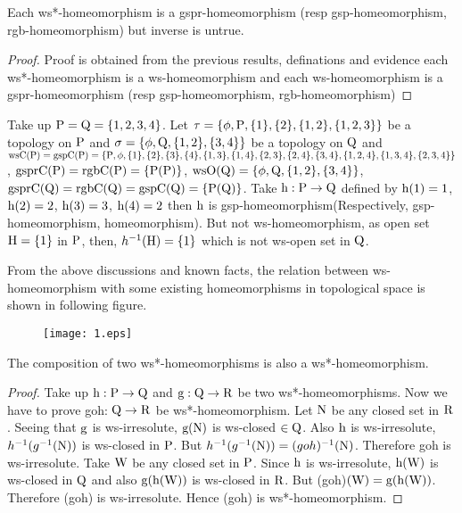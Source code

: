\begin{thm}\label{thm5.2.7}
Each ws*-homeomorphism is a gspr-homeomorphism (resp gsp-homeomorphism, rgb-homeomorphism) but inverse is untrue.
\end{thm}

\begin{proof}
Proof is obtained from the previous results, definations and evidence each ws*-homeomorphism is a ws-homeomorphism and each ws-homeomorphism is a gspr-homeomorphism (resp gsp-homeomorphism, rgb-homeomorphism)
\end{proof}

\begin{exm}\label{exam5.2.10}
Take up $\mathrm{P}=\mathrm{Q}= \{1, 2, 3, 4\}$. Let $\tau= \{\phi, \TSP, \{1\}, \{2\}, \{1, 2\},\break \{1,2,3\}\}$ be a topology on $\mathrm{P}$ and $\sigma=\{\phi,\mathrm{Q},\{1,2\},\{3,4\}\}$ be a topology on $\mathrm{Q}$ and $\ws\TSC(\TSP)= \gsp\TSC(\TSP)=\{\TSP, \phi,\{1\},\{2\},\{3\},\{4\},\{1,3\},\{1,4\},\{2,3\},\{2,4\},\{3,4\},\break \{1,2,4\},\{1,3,4\},\{2,3,4\}\}$, $\mathrm{gspr}\mathrm{C}(\mathrm{P})=\mathrm{rgb}\mathrm{C}(\mathrm{P})=\{\mathrm{P}(\mathrm{P})\}$, $\ws\TSO(\TSQ)=\{\phi,\TSQ,\{1,2\},\break \{3,4\}\}$, $\mathrm{gspr}\mathrm{C}(\mathrm{Q})=\mathrm{rgb}\mathrm{C}(\mathrm{Q})=\mathrm{gsp}\mathrm{C}(\mathrm{Q})=\{\mathrm{P}(\mathrm{Q})\}$. Take $\mathrm{h}: \mathrm{P}\to \mathrm{Q}$ defined by $\mathrm{h}(1)=1$, $\mathrm{h}(2)= 2$, $\mathrm{h}(3)=3$, $\mathrm{h}(4)=2$ then $\mathrm{h}$ is gsp-homeomorphism(Respectively, gsp-homeomorphism, homeomorphism). But not ws-homeomorphism, as open set $\mathrm{H}= \{1\}$ in $\mathrm{P}$, then, $h^{-1} (\mathrm{H}) = \{1\}$ which is not ws-open set in $\mathrm{Q}$.
\end{exm}

\begin{rem}\label{rem5.2.3} 
From the above discussions and known facts, the relation between ws-homeomorphism with some existing homeomorphisms in topological space is shown in
following figure.
\begin{figure}[!ht]
\centering
\texttt{[image: 1.eps]}
\end{figure}
\end{rem}

\begin{thm}\label{thm5.2.8} 
The composition of two ws*-homeomorphisms is also a ws*-{\break}homeomor\-phism.
\end{thm}

\begin{proof}
Take up $\mathrm{h}: \mathrm{P}\to \mathrm{Q}$ and $\mathrm{g}: \mathrm{Q}\to \mathrm{R}$ be two ws*-homeomorphisms. Now we have to prove goh: $\mathrm{Q}\to \mathrm{R}$ be ws*-homeomorphism. Let $\mathrm{N}$ be any closed set in $\mathrm{R}$. Seeing that $\mathrm{g}$ is ws-irresolute, $\mathrm{g}(\mathrm{N})$ is ws-closed $\in \mathrm{Q}$. Also $\mathrm{h}$ is ws-irresolute, $h^{-1} (g^{-1} (\mathrm{N}))$ is ws-closed in $\mathrm{P}$. But $h^{-1} (g^{-1}(\mathrm{N}))= (goh)^{-1}(\mathrm{N})$. Therefore goh is ws-irresolute. Take $\mathrm{W}$ be any closed set in $\mathrm{P}$. Since $\mathrm{h}$ is ws-irresolute, $\mathrm{h}(\mathrm{W})$ is ws-closed in $\mathrm{Q}$ and also $\mathrm{g}(\mathrm{h}(\mathrm{W}))$ is ws-closed in $\mathrm{R}$. But (goh)$(\mathrm{W})=\mathrm{g}(\mathrm{h}(\mathrm{W}))$. Therefore (goh) is ws-irresolute. Hence (goh) is ws*-homeomorphism.
\end{proof}

